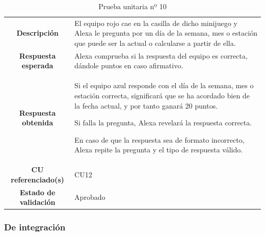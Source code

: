 \begin{table}[H]
	\centering
	\begin{tabular}{|c|p{9cm}|}
		\hline
		\rowcolor{lightgray}
		\multicolumn{2}{|c|}{\textbf{PU10}: Minijuego recuerda la fecha} \\
		\hline
		\textbf{Descripción} & El equipo rojo cae en la casilla de dicho minijuego y Alexa le pregunta por un día de la semana, mes o estación que puede ser la actual o calcularse a partir de ella.
		\vspace{0.2cm} \\
		\hline
		\textbf{Respuesta esperada} & Alexa comprueba si la respuesta del equipo es correcta, dándole puntos en caso afirmativo. \vspace{0.2cm} \\
		\hline
		\textbf{Respuesta obtenida} & Si el equipo azul responde con el día de la semana, mes o estación correcta, significará que se ha acordado bien de la fecha actual, y por tanto ganará 20 puntos.
		
		Si falla la pregunta, Alexa revelará la respuesta correcta.
		
		En caso de que la respuesta sea de formato incorrecto, Alexa repite la pregunta y el tipo de respuesta válido. \\
		\hline
		\textbf{CU referenciado(s)} & CU12 \vspace{0.2cm} \\
		\hline
		\textbf{Estado de validación} & Aprobado \vspace{0.2cm} \\
		\hline
	\end{tabular}
	\caption{Prueba unitaria nº 10}
	\label{tab:PU10}
\end{table}

\subsubsection{De integración}

